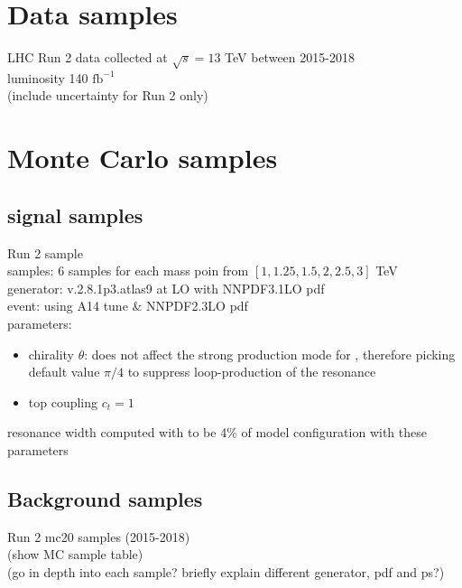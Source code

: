 \documentclass[../thesis.tex]{subfiles}
\begin{document}
\vspace{-1\baselineskip}

\section{Data samples}
\label{sec:data}
LHC Run 2 data collected at $\sqrt{s}=13$ TeV between 2015-2018\\
luminosity 140 $\text{fb}^{-1}$ \\
(include uncertainty for Run 2 only)

\section{Monte Carlo samples}
\label{sec:montecarlo}

\subsection{\ttZp signal samples}
Run 2 \ttZp sample\\
samples: 6 samples for each mass poin from $[1, 1.25, 1.5, 2, 2.5, 3]$ TeV\\
generator: \mgamc v.2.8.1p3.atlas9 at LO with \textsc{NNPDF3.1LO} pdf\\
event: \pythia[v.244p3.rangefix] using \textsc{A14} tune \& \textsc{NNPDF2.3LO} pdf\\
parameters:
\begin{itemize}
\item chirality $\theta$: does not affect the strong production mode for \ttZp, therefore picking default value $\pi/4$ to suppress loop-production of the \Zp resonance
\item top coupling $c_t=1$
\end{itemize}
resonance width computed with \mgamc to be 4\% of model configuration with these parameters

\subsection{Background samples}
Run 2 mc20 samples (2015-2018)\\
(show MC sample table)\\
(go in depth into each sample? briefly explain different generator, pdf and ps?)
\end{document}
